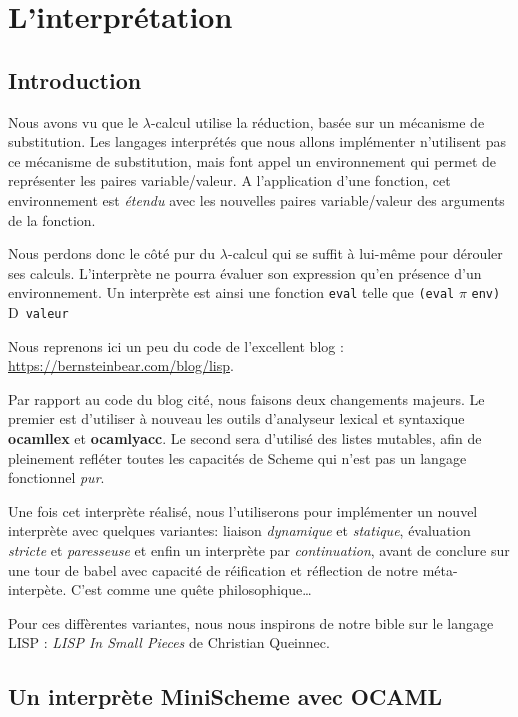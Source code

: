 \documentclass[11pt]{book}
\newcommand{\imp}{{\letterimp D}\hspace{0.1cm}}
\begin{document}
\chapter{L'interprétation}

\section{Introduction}
Nous avons vu que le $\lambda$-calcul utilise la réduction, basée sur un mécanisme de substitution.
Les langages interprétés que nous allons implémenter n'utilisent pas ce mécanisme de substitution, mais
font appel un environnement qui permet de représenter les paires variable/valeur.
A l'application d'une fonction, cet environnement est \textit{étendu} avec les nouvelles paires variable/valeur
des arguments de la fonction.

Nous perdons donc le côté  pur du $\lambda$-calcul qui se suffit à lui-même pour
dérouler ses calculs.
L'interprète ne pourra évaluer son expression qu'en présence d'un environnement.
Un interprète est ainsi  une fonction \verb+eval+ telle que \verb+(eval+ $\pi$ \verb+env)+ \imp\  \verb+valeur+

Nous reprenons ici  un peu du code de l'excellent blog :
\url{https://bernsteinbear.com/blog/lisp}.

Par rapport au code du blog cité, nous faisons deux changements majeurs. Le premier est d'utiliser à nouveau
les outils d'analyseur lexical et syntaxique \textbf{ocamllex} et \textbf{ocamlyacc}. 
Le second sera d'utilisé des listes mutables, afin de pleinement refléter toutes les capacités de Scheme qui n'est
pas un langage fonctionnel \textit{pur}.

Une fois cet interprète réalisé, nous l'utiliserons pour implémenter un nouvel interprète avec quelques variantes:
liaison \textit{dynamique} et \textit{statique}, évaluation \textit{stricte} et \textit{paresseuse} 
et enfin un interprète par \textit{continuation}, avant de conclure sur une tour de babel avec capacité de réification
et réflection de notre méta-interpète. C'est comme une quête philosophique\dots

Pour ces diffèrentes variantes, nous nous inspirons de notre bible sur le langage LISP : \textit{LISP In Small Pieces} de Christian Queinnec.
\cite{lisp}

\section{Un interprète MiniScheme avec OCAML}
\end{document}

